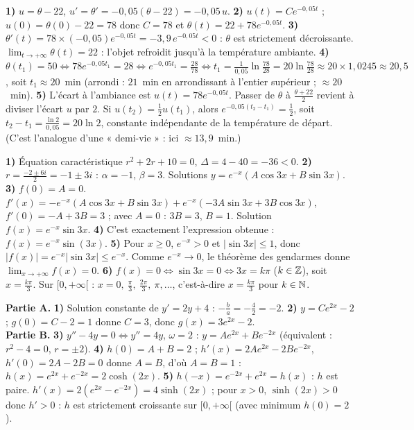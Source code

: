 \textbf{1)} $u=\theta-22$, $u'=\theta'=-0{,}05(\theta-22)=-0{,}05\,u$.\;
\textbf{2)} $u(t)=Ce^{-0{,}05t}$ ; $u(0)=\theta(0)-22=78$ donc $C=78$ et
$\theta(t)=22+78e^{-0{,}05t}$.\;
\textbf{3)} $\theta'(t)=78\times(-0{,}05)e^{-0{,}05t}=-3{,}9\,e^{-0{,}05t}<0$ :
$\theta$ est strictement décroissante. $\displaystyle\lim_{t\to+\infty}\theta(t)=22$ :
l'objet refroidit jusqu'à la température ambiante.\;
\textbf{4)} $\theta(t_1)=50 \Leftrightarrow 78e^{-0{,}05t_1}=28 \Leftrightarrow
e^{-0{,}05t_1}=\frac{28}{78} \Leftrightarrow t_1=\frac{1}{0{,}05}\ln\frac{78}{28}
=20\ln\frac{78}{28}\approx 20\times1{,}0245\approx 20{,}5$, soit $t_1\approx 20$~min
(arrondi : $21$~min en arrondissant à l'entier supérieur ; $\approx 20$~min).\;
\textbf{5)} L'écart à l'ambiance est $u(t)=78e^{-0{,}05t}$. Passer de $\theta$ à
$\frac{\theta+22}{2}$ revient à diviser l'écart $u$ par $2$. Si $u(t_2)=\frac12 u(t_1)$,
alors $e^{-0{,}05(t_2-t_1)}=\frac12$, soit $t_2-t_1=\frac{\ln2}{0{,}05}=20\ln2$,
constante indépendante de la température de départ. (C'est l'analogue d'une
« demi-vie » : ici $\approx 13{,}9$~min.)

\textbf{1)} Équation caractéristique $r^2+2r+10=0$, $\Delta=4-40=-36<0$.\;
\textbf{2)} $r=\frac{-2\pm6i}{2}=-1\pm3i$ : $\alpha=-1$, $\beta=3$. Solutions
$y=e^{-x}(A\cos3x+B\sin3x)$.\;
\textbf{3)} $f(0)=A=0$. $f'(x)=-e^{-x}(A\cos3x+B\sin3x)+e^{-x}(-3A\sin3x+3B\cos3x)$,
$f'(0)=-A+3B=3$ ; avec $A=0$ : $3B=3$, $B=1$. Solution $f(x)=e^{-x}\sin3x$.\;
\textbf{4)} C'est exactement l'expression obtenue : $f(x)=e^{-x}\sin(3x)$.\;
\textbf{5)} Pour $x\ge0$, $e^{-x}>0$ et $|\sin3x|\le1$, donc
$|f(x)|=e^{-x}|\sin3x|\le e^{-x}$. Comme $e^{-x}\to0$, le théorème des gendarmes
donne $\displaystyle\lim_{x\to+\infty}f(x)=0$.\;
\textbf{6)} $f(x)=0 \Leftrightarrow \sin3x=0 \Leftrightarrow 3x=k\pi$
($k\in\mathbb{Z}$), soit $x=\frac{k\pi}{3}$. Sur $[0,+\infty[$ : $x=0,\ \frac{\pi}{3},\
\frac{2\pi}{3},\ \pi,\dots$, c'est-à-dire $x=\frac{k\pi}{3}$ pour $k\in\mathbb{N}$.

\textbf{Partie A.}
\textbf{1)} Solution constante de $y'=2y+4$ : $-\frac ba=-\frac{4}{2}=-2$.\;
\textbf{2)} $y=Ce^{2x}-2$ ; $g(0)=C-2=1$ donne $C=3$, donc $g(x)=3e^{2x}-2$.\\
\textbf{Partie B.}
\textbf{3)} $y''-4y=0 \Leftrightarrow y''=4y$, $\omega=2$ : $y=Ae^{2x}+Be^{-2x}$
(équivalent : $r^2-4=0$, $r=\pm2$).\;
\textbf{4)} $h(0)=A+B=2$ ; $h'(x)=2Ae^{2x}-2Be^{-2x}$, $h'(0)=2A-2B=0$ donne $A=B$,
d'où $A=B=1$ : $h(x)=e^{2x}+e^{-2x}=2\cosh(2x)$.\;
\textbf{5)} $h(-x)=e^{-2x}+e^{2x}=h(x)$ : $h$ est paire. $h'(x)=2(e^{2x}-e^{-2x})
=4\sinh(2x)$ ; pour $x>0$, $\sinh(2x)>0$ donc $h'>0$ : $h$ est strictement
croissante sur $[0,+\infty[$ (avec minimum $h(0)=2$).
